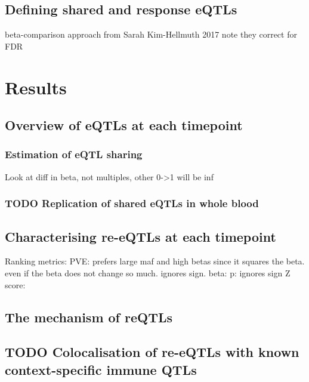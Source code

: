 \subsection{Defining shared and response eQTLs}

beta-comparison approach from Sarah Kim-Hellmuth 2017
    note they correct for FDR

\section{Results}

\subsection{Overview of eQTLs at each timepoint}


\subsubsection{Estimation of eQTL sharing}


Look at diff in beta, not multiples, other 0->1 will be inf

\subsubsection{TODO Replication of shared eQTLs in whole blood}

\subsection{Characterising re-eQTLs at each timepoint}

Ranking metrics:
PVE: prefers large maf and high betas since it squares the beta. even if the beta does not change so much. ignores sign.
beta: 
p: ignores sign
Z score: 

\subsection{The mechanism of reQTLs}

\subsection{TODO Colocalisation of re-eQTLs with known context-specific immune QTLs}

